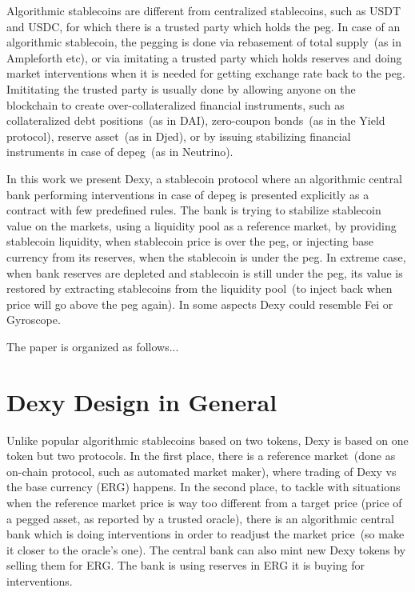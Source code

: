\documentclass{article}   %
\newcommand{\authnote}[2]{\marginpar{\parbox{\marginparwidth}{\tiny %
  \textsf{#1 {\textcolor{blue}{notes: #2}}}}}%
  \textcolor{blue}{\textbf{\dag}}}
\newcommand{\authnote}[2]{
  \textsf{#1 \textcolor{blue}{: #2}}}
\newcommand{\authnote}[2]{}
\newcommand{\knote}[1]{{\authnote{\textcolor{green}{Alex notes}}{#1}}}
\newcommand{\bc}{ERG}
\newcommand{\dx}{Dexy}
\begin{document}
Algorithmic stablecoins are different from centralized stablecoins, such as USDT and USDC, for which there is a trusted party which holds the peg. In case of an algorithmic stablecoin, the 
pegging is done via rebasement of total supply~(as in Ampleforth etc), or via imitating a trusted party which holds reserves and doing market interventions when it is needed for getting exchange rate back to the peg. Imititating the trusted party is usually done by allowing anyone on the blockchain to create over-collateralized financial instruments, such as collateralized debt positions~(as 
in DAI), zero-coupon bonds~(as in the Yield protocol), reserve asset~(as in Djed), or by issuing stabilizing financial instruments in case of depeg~(as in Neutrino). \knote{add links to the paragraph above}

In this work we present \dx{}, a stablecoin protocol where an algorithmic central bank performing interventions in case of depeg is presented explicitly as a contract with few predefined rules. The bank is trying to stabilize stablecoin value on the markets, using a liquidity pool as a reference market, by providing stablecoin liquidity, when stablecoin price is over the peg, or injecting base currency from its reserves, when the stablecoin is under the peg. In extreme case, when bank reserves are depleted and stablecoin is still under the peg, its value is restored by extracting stablecoins from the liquidity pool~(to inject back when price will go above the peg again). In some aspects \dx{} could resemble Fei or Gyroscope. \knote{make comparison subsection}  

The paper is organized as follows... \knote{finish}


\section{\dx{} Design in General}

Unlike popular algorithmic stablecoins based on two tokens, \dx{} is based on one token but two protocols. In the first place, 
there is a reference market~(done as on-chain protocol, such as automated market maker), where trading of \dx{} vs the base currency (\bc{}) happens. In the second place, to tackle with situations when the reference market price is way too different from a target price (price of a pegged asset, as reported by a trusted oracle), there is an algorithmic central bank which is doing interventions in order to readjust the market price~(so make it closer to the oracle's one). The central bank can also mint new \dx{} tokens by selling them for \bc{}. The bank is using reserves in \bc{} it is buying for interventions. 
\end{document}
